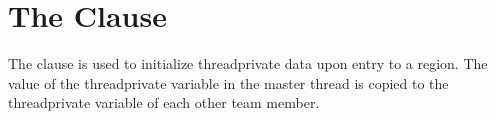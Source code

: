 \pagebreak
\section{The  Clause}
\label{sec:copyin}

The  clause is used to initialize threadprivate data upon entry 
to a  region. The value of the threadprivate variable in the master 
thread is copied to the threadprivate variable of each other team member.




